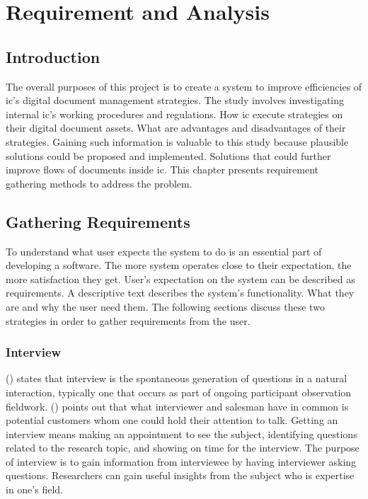 \chapter{Requirement and Analysis}
\section{Introduction}
The overall purposes of this project is to create a system to improve efficiencies of \gls{ic}'s digital document management strategies. 
The study involves investigating internal \gls{ic}'s working procedures and regulations.
How \gls{ic} execute strategies on their digital document assets.
What are advantages and disadvantages of their strategies.
Gaining such information is valuable to this study because plausible solutions could be proposed and implemented. 
Solutions that could further improve flows of documents inside \gls{ic}.
This chapter presents requirement gathering methods to address the problem.

\section{Gathering Requirements}
To understand what user expects the system to do is an essential part of developing a software.
The more system operates close to their expectation, the more satisfaction they get.
User's expectation on the system can be described as requirements.
A descriptive text describes the system's functionality.
What they are and why the user need them.
The following sections discuss these two strategies in order to gather requirements from the user.

\subsection{Interview}
\citeauthor{gall7j} (\citeyear{gall7j}) states that interview is the spontaneous generation of questions in a natural interaction, typically one that occurs as part of ongoing participant observation fieldwork.
\citeauthor{brady2011craft} (\citeyear{brady2011craft}) points out that what interviewer and salesman have in common is potential customers whom one could hold their attention to talk.
Getting an interview means making an appointment to see the subject, identifying questions related to the research topic, and showing on time for the interview.
The purpose of interview is to gain information from interviewee by having interviewer asking questions.
Researchers can gain useful insights from the subject who is expertise in one's field.

